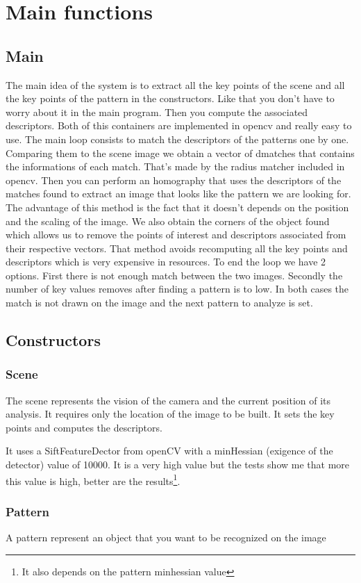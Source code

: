 \documentclass[english,a4paper,11pt]{report}
\begin{document}
	\chapter{Main functions}
	
	\section{Main}
		 The main idea of the system is to extract all the key points of the scene and all the key points of the pattern in the constructors. Like that you don't have to worry about it in the main program. 
		Then you compute the associated descriptors. Both of this containers are implemented in opencv and really easy to use. 
	The main loop consists to match the descriptors of the patterns one by one. Comparing them to the scene image we obtain a vector of dmatches that contains the informations of each match. That's made by the radius matcher included in opencv. 
	Then you can perform an homography  that uses the descriptors of the matches found to extract an image that looks like the pattern we are looking for. The advantage of this method is the fact that it doesn't depends on the position and the scaling of the image. We also obtain the corners of the object found which allows us to remove the points of interest and descriptors associated from their respective vectors. That method avoids recomputing all the key points and descriptors which is very expensive in resources. 
	To end the loop we have 2 options. First there is not enough match between the two images. Secondly the number of key values removes after finding a pattern is to low. In both cases the match is not drawn on the image and the next pattern to analyze is set.
	\section{Constructors}
	\label{constructors}
	\subsection{Scene}
	\par The scene represents the vision of the camera and the current position of its analysis. 
	It requires only the location of the image to be built. It sets the key points and computes the descriptors. 
	\par It uses a SiftFeatureDector from openCV with a minHessian (exigence of the detector) value of 10000. It is a very high value but the tests show me that more this value is high, better are the results\footnote{It also depends on the pattern minhessian value}.
	\subsection{Pattern}
	A pattern represent an object that you want to be recognized on the image

	{}
	
	
\end{document}
